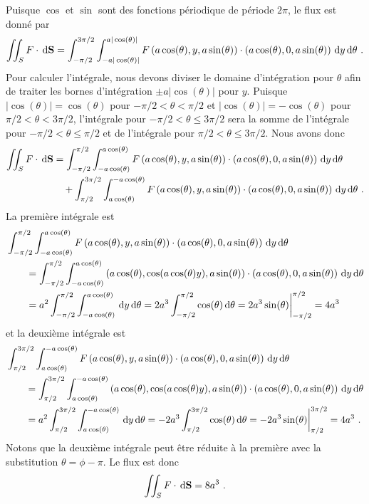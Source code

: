 {Puisque $\cos$ et $\sin$ sont des fonctions périodique de période
$2\pi$, le flux est donné par
\[
\iint_S F \cdot \,\mathrm{d}\mathbf{S}
= \int_{-\pi/2}^{3\pi/2}\int_{-a|\cos(\theta)|}^{a|\cos(\theta)|}
F\left(a\cos(\theta),y,a\sin(\theta)\right)
\cdot \left( a\cos(\theta), 0 , a \sin(\theta) \right)
\,\mathrm{d}y\,\mathrm{d}\theta \ .
\]
Pour calculer l'intégrale, nous devons diviser le
domaine d'intégration pour $\theta$ afin de traiter les bornes
d'intégration $\pm a|\cos(\theta)|$ pour $y$.
Puisque $|\cos(\theta)| = \cos(\theta)$
pour $-\pi/2 < \theta < \pi/2$ et $|\cos(\theta)| = -\cos(\theta)$ pour
$\pi/2 < \theta < 3\pi/2$, l'intégrale
pour $-\pi/2 < \theta \leq 3\pi/2$ sera la somme de
l'intégrale pour $-\pi/2 < \theta \leq \pi/2$ et de l'intégrale
pour $\pi/2 < \theta \leq 3\pi/2$.  Nous avons donc
\begin{align*}
\iint_S F \cdot \,\mathrm{d}\mathbf{S}
&=\int_{-\pi/2}^{\pi/2}\int_{-a\cos(\theta)}^{a\cos(\theta)}
F\left(a\cos(\theta),y,a\sin(\theta)\right)
\cdot \left(a\cos(\theta), 0 , a \sin(\theta) \right) \,\mathrm{d}y\,\mathrm{d}\theta \\
&\quad + \int_{\pi/2}^{3\pi/2}\int_{a\cos(\theta)}^{-a\cos(\theta)}
F\left(a\cos(\theta),y,a\sin(\theta)\right)
\cdot \left( a\cos(\theta), 0 , a \sin(\theta) \right) \,\mathrm{d}y\,\mathrm{d}\theta \ .
\end{align*}
La première intégrale est
\begin{align*}
&  \int_{-\pi/2}^{\pi/2}\int_{-a\cos(\theta)}^{a\cos(\theta)}
F\left(a\cos(\theta),y,a\sin(\theta)\right)
\cdot \left( a\cos(\theta), 0 , a \sin(\theta) \right) \,\mathrm{d}y\,\mathrm{d}\theta \\
& \qquad = \int_{-\pi/2}^{\pi/2}\int_{-a\cos(\theta)}^{a\cos(\theta)}
\left(a\cos(\theta),\cos(a\cos(\theta) y),a\sin(\theta)\right)
\cdot \left( a\cos(\theta), 0 , a \sin(\theta) \right) \,\mathrm{d}y\,\mathrm{d}\theta \\
& \qquad = a^2 \int_{-\pi/2}^{\pi/2}\int_{-a\cos(\theta)}^{a\cos(\theta)}
\,\mathrm{d}y\,\mathrm{d}\theta
= 2 a^3 \int_{-\pi/2}^{\pi/2}\cos(\theta)\,\mathrm{d}\theta
= 2 a^3 \sin(\theta)\bigg|_{-\pi/2}^{\pi/2} = 4 a^3
\end{align*}
et la deuxième intégrale est
\begin{align*}
& \int_{\pi/2}^{3\pi/2}\int_{a\cos(\theta)}^{-a\cos(\theta)}
F\left(a\cos(\theta),y,a\sin(\theta)\right)
\cdot \left( a\cos(\theta), 0 , a \sin(\theta) \right) \,\mathrm{d}y\,\mathrm{d}\theta \\
& \qquad = \int_{\pi/2}^{3\pi/2}\int_{a\cos(\theta)}^{-a\cos(\theta)}
\left(a\cos(\theta),\cos(a\cos(\theta) y),a\sin(\theta)\right)
\cdot \left( a\cos(\theta), 0 , a \sin(\theta) \right) \,\mathrm{d}y\,\mathrm{d}\theta \\
& \qquad = a^2 \int_{\pi/2}^{3\pi/2}\int_{a\cos(\theta)}^{-a\cos(\theta)}
\,\mathrm{d}y\,\mathrm{d}\theta
= -2 a^3 \int_{\pi/2}^{3\pi/2}\cos(\theta)\,\mathrm{d}\theta
= -2 a^3 \sin(\theta)\bigg|_{\pi/2}^{3\pi/2} = 4 a^3 \ .
\end{align*}
Notons que la deuxième intégrale peut être réduite à la première avec
la substitution $\theta = \phi - \pi$.  Le flux est donc
\[
  \iint_S F \cdot \,\mathrm{d}\mathbf{S} = 8 a^3 \ .
\]
}

